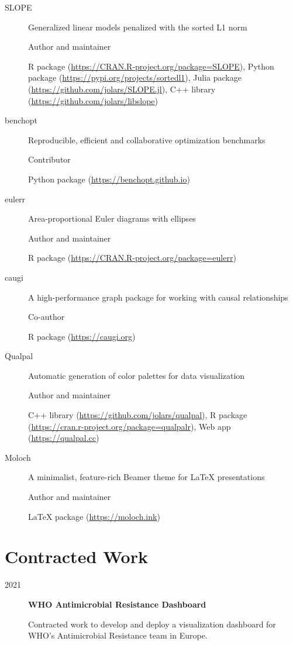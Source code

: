 \documentclass[
  a4paper,
]{article}
\begin{document}
\begin{description}
\item[SLOPE]
Generalized linear models penalized with the sorted L1 norm

Author and maintainer

R package (\url{https://CRAN.R-project.org/package=SLOPE}), Python
package (\url{https://pypi.org/projects/sortedl1}), Julia package
(\url{https://github.com/jolars/SLOPE.jl}), C++ library
(\url{https://github.com/jolars/libslope})
\item[benchopt]
Reproducible, efficient and collaborative optimization benchmarks

Contributor

Python package (\url{https://benchopt.github.io})
\item[eulerr]
Area-proportional Euler diagrams with ellipses

Author and maintainer

R package (\url{https://CRAN.R-project.org/package=eulerr})
\item[caugi]
A high-performance graph package for working with causal relationships

Co-author

R package (\url{https://caugi.org})
\item[Qualpal]
Automatic generation of color palettes for data visualization

Author and maintainer

C++ library (\url{https://github.com/jolars/qualpal}), R package
(\url{https://cran.r-project.org/package=qualpalr}), Web app
(\url{https://qualpal.cc})
\item[Moloch]
A minimalist, feature-rich Beamer theme for LaTeX presentations

Author and maintainer

LaTeX package (\url{https://moloch.ink})
\end{description}

\section{Contracted Work}\label{contracted-work}

\begin{description}
\item[2021]
\textbf{WHO Antimicrobial Resistance Dashboard}

Contracted work to develop and deploy a visualization dashboard for
WHO's Antimicrobial Resistance team in Europe.
\end{description}
\end{document}
